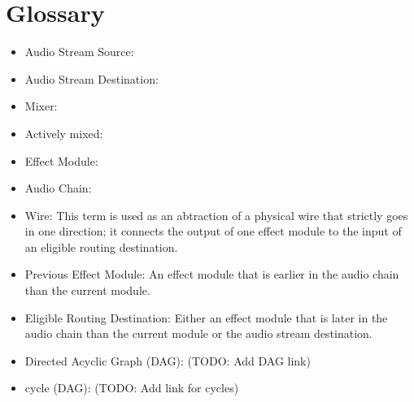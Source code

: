 \chapter{Glossary}

\begin{itemize}
	\item Audio Stream Source:
	\item Audio Stream Destination:
	\item Mixer:
	\item Actively mixed:
	\item Effect Module:
	\item Audio Chain:
	\item Wire: This term is used as an abtraction of a physical wire that strictly goes in one direction; it connects the output of one effect module to the input of an eligible routing destination.
	\item Previous Effect Module: An effect module that is earlier in the audio chain than the current module. 
	\item Eligible Routing Destination: Either an effect module that is later in the audio chain than the current module or the audio stream destination.
	\item Directed Acyclic Graph (DAG): (TODO: Add DAG link)
	\item cycle (DAG): (TODO: Add link for cycles)
\end{itemize}	